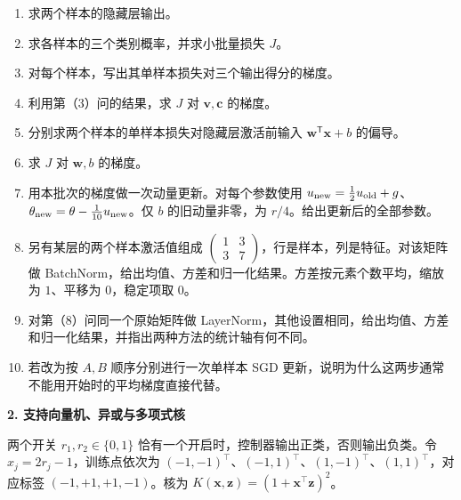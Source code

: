 \begin{enumerate}[label=(\arabic*)]
\item 求两个样本的隐藏层输出。
\item 求各样本的三个类别概率，并求小批量损失 $J$。
\item 对每个样本，写出其单样本损失对三个输出得分的梯度。
\item 利用第（3）问的结果，求 $J$ 对 $\bm{v},\bm{c}$ 的梯度。
\item 分别求两个样本的单样本损失对隐藏层激活前输入 $\bm{w}^{\mathsf T}\bm{x}+b$ 的偏导。
\item 求 $J$ 对 $\bm{w},b$ 的梯度。
\item 用本批次的梯度做一次动量更新。对每个参数使用 $u_{\rm new}=\tfrac12 u_{\rm old}+g$、$\theta_{\rm new}=\theta-\tfrac1{10}u_{\rm new}$。仅 $b$ 的旧动量非零，为 $r/4$。给出更新后的全部参数。
\item 另有某层的两个样本激活值组成 $\begin{pmatrix}1&3\\3&7\end{pmatrix}$，行是样本，列是特征。对该矩阵做 BatchNorm，给出均值、方差和归一化结果。方差按元素个数平均，缩放为 $1$、平移为 $0$，稳定项取 $0$。
\item 对第（8）问同一个原始矩阵做 LayerNorm，其他设置相同，给出均值、方差和归一化结果，并指出两种方法的统计轴有何不同。
\item 若改为按 $A,B$ 顺序分别进行一次单样本 SGD 更新，说明为什么这两步通常不能用开始时的平均梯度直接代替。
\end{enumerate}

\noindent\textbf{2. 支持向量机、异或与多项式核}

两个开关 $r_1,r_2\in\{0,1\}$ 恰有一个开启时，控制器输出正类，否则输出负类。令 $x_j=2r_j-1$，训练点依次为 $(-1,-1)^\top$、$(-1,1)^\top$、$(1,-1)^\top$、$(1,1)^\top$，对应标签 $(-1,+1,+1,-1)$。核为 $K(\bm x,\bm z)=(1+\bm x^\top\bm z)^2$。

